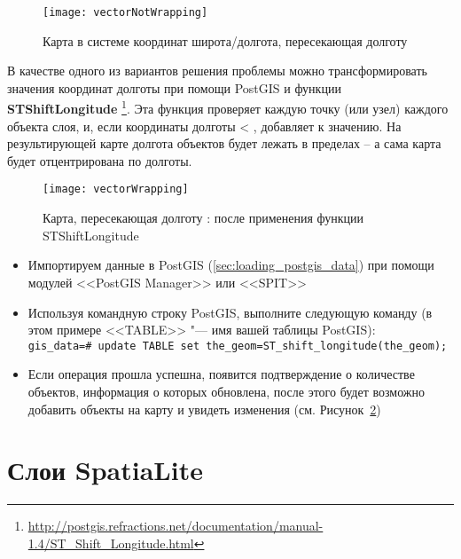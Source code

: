 \begin{figure}[ht]
   \centering
   \texttt{[image: vectorNotWrapping]}
      \caption{Карта в системе координат широта/долгота, пересекающая долготу  \nixcaption}
   \label{fig:vector_not_wrapping}
\end{figure}

В качестве одного из вариантов решения проблемы можно трансформировать
значения координат долготы при помощи PostGIS и функции
\textbf{ST\textunderscore Shift\textunderscore Longitude}
\footnote{\url{http://postgis.refractions.net/documentation/manual-1.4/ST\_Shift\_Longitude.html}}.
Эта функция проверяет каждую точку (или узел) каждого объекта слоя, и,
если координаты долготы < , добавляет  к значению.
На результирующей карте долгота объектов будет лежать в пределах
 --  а сама карта будет отцентрирована по
 долготы.

\begin{figure}[ht]
   \centering
   \texttt{[image: vectorWrapping]}
   \caption{Карта, пересекающая долготу : после применения функции ST\textunderscore Shift\textunderscore Longitude \nixcaption}
\label{fig:vector_wrapping}
\end{figure}


\begin{itemize}[label=--]
\item Импортируем данные в PostGIS (\ref{sec:loading_postgis_data}) при помощи
модулей <<PostGIS Manager>> или <<SPIT>>
\item Используя командную строку PostGIS, выполните следующую команду
(в этом примере <<TABLE>> "--- имя вашей таблицы PostGIS): \\
\texttt{gis\_data=\# update TABLE set the\_geom=ST\_shift\_longitude(the\_geom);}
\item Если операция прошла успешна, появится подтверждение о количестве
объектов, информация о которых обновлена, после этого будет возможно добавить
объекты на карту и увидеть изменения (см. Рисунок~\ref{fig:vector_wrapping})
\end{itemize}

\section{Слои SpatiaLite}
\label{label_spatialite}

